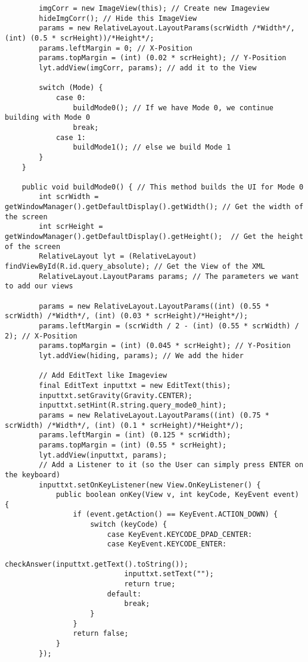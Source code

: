 \begin{lstlisting}
        imgCorr = new ImageView(this); // Create new Imageview
        hideImgCorr(); // Hide this ImageView
        params = new RelativeLayout.LayoutParams(scrWidth /*Width*/, (int) (0.5 * scrHeight))/*Height*/;
        params.leftMargin = 0; // X-Position
        params.topMargin = (int) (0.02 * scrHeight); // Y-Position
        lyt.addView(imgCorr, params); // add it to the View

        switch (Mode) {
            case 0:
                buildMode0(); // If we have Mode 0, we continue building with Mode 0
                break;
            case 1:
                buildMode1(); // else we build Mode 1
        }
    }

    public void buildMode0() { // This method builds the UI for Mode 0
        int scrWidth = getWindowManager().getDefaultDisplay().getWidth(); // Get the width of the screen
        int scrHeight = getWindowManager().getDefaultDisplay().getHeight();  // Get the height of the screen
        RelativeLayout lyt = (RelativeLayout) findViewById(R.id.query_absolute); // Get the View of the XML
        RelativeLayout.LayoutParams params; // The parameters we want to add our views

        params = new RelativeLayout.LayoutParams((int) (0.55 * scrWidth) /*Width*/, (int) (0.03 * scrHeight)/*Height*/);
        params.leftMargin = (scrWidth / 2 - (int) (0.55 * scrWidth) / 2); // X-Position
        params.topMargin = (int) (0.045 * scrHeight); // Y-Position
        lyt.addView(hiding, params); // We add the hider

        // Add EditText like Imageview
        final EditText inputtxt = new EditText(this);
        inputtxt.setGravity(Gravity.CENTER);
        inputtxt.setHint(R.string.query_mode0_hint);
        params = new RelativeLayout.LayoutParams((int) (0.75 * scrWidth) /*Width*/, (int) (0.1 * scrHeight)/*Height*/);
        params.leftMargin = (int) (0.125 * scrWidth);
        params.topMargin = (int) (0.55 * scrHeight);
        lyt.addView(inputtxt, params);
        // Add a Listener to it (so the User can simply press ENTER on the keyboard)
        inputtxt.setOnKeyListener(new View.OnKeyListener() {
            public boolean onKey(View v, int keyCode, KeyEvent event) {
                if (event.getAction() == KeyEvent.ACTION_DOWN) {
                    switch (keyCode) {
                        case KeyEvent.KEYCODE_DPAD_CENTER:
                        case KeyEvent.KEYCODE_ENTER:
                            checkAnswer(inputtxt.getText().toString());
                            inputtxt.setText("");
                            return true;
                        default:
                            break;
                    }
                }
                return false;
            }
        });


\end{lstlisting}
